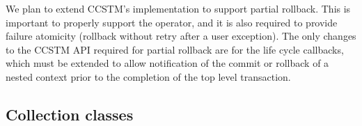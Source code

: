 We plan to extend CCSTM's implementation to support partial rollback.
This is important to properly support the  operator, and
it is also required to provide failure atomicity (rollback without retry
after a user exception).  The only changes to the CCSTM API required
for partial rollback are for the life cycle callbacks, which must be
extended to allow notification of the commit or rollback of a nested
context prior to the completion of the top level transaction.

\subsection{Collection classes}


